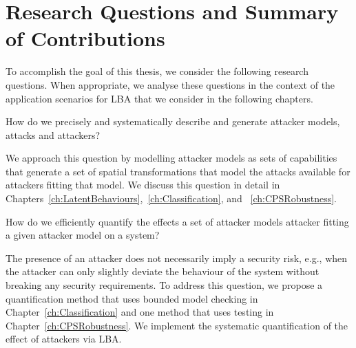 \section{Research Questions and Summary of Contributions}
\label{sec:Introduction:ResearchQuestions}
To accomplish the goal of this thesis, we consider the following research questions. When appropriate, we analyse these questions in the context of the application scenarios for LBA that we consider in the following chapters. 
\begin{question}
\label{que:AttackerModel}
How do we precisely and systematically describe and generate attacker models, attacks and attackers?
\end{question}
We approach this question by modelling attacker models as sets of capabilities that generate a set of spatial transformations that model the attacks available for attackers fitting that model. We discuss this question in detail in Chapters~\ref{ch:LatentBehaviours},~\ref{ch:Classification}, and ~\ref{ch:CPSRobustness}.
\begin{question}
\label{que:Quantification}
How do we efficiently quantify the effects a set of attacker models attacker fitting a given attacker model on a system? 
\end{question}
The presence of an attacker does not necessarily imply a security risk, e.g., when the attacker can only slightly deviate the behaviour of the system without breaking any security requirements. To address this question, we propose a quantification method that uses bounded model checking in Chapter~\ref{ch:Classification} and one method that uses testing in Chapter~\ref{ch:CPSRobustness}. We implement the systematic quantification of the effect of attackers via LBA. 

